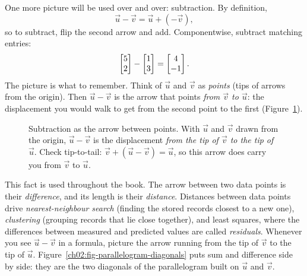 One more picture will be used over and over: subtraction. By definition,
\[
  \vec{u} - \vec{v} = \vec{u} + (-\vec{v}),
\]
so to subtract, flip the second arrow and add. Componentwise, subtract matching entries:
\[
  \begin{bmatrix}5\\2\end{bmatrix} - \begin{bmatrix}1\\3\end{bmatrix} = \begin{bmatrix}4\\-1\end{bmatrix}.
\]
The picture is what to remember. Think of $\vec{u}$ and $\vec{v}$ as
\emph{points} (tips of arrows from the origin). Then $\vec{u}-\vec{v}$ is the arrow that
points \emph{from $\vec{v}$ to $\vec{u}$}: the displacement you would walk to get from the
second point to the first (Figure~\ref{ch02:fig-subtract}).

\begin{figure}[H]
\centering
{}
\caption{Subtraction as the arrow between points. With $\vec{u}$ and $\vec{v}$ drawn from
the origin, $\vec{u}-\vec{v}$ is the displacement \emph{from the tip of $\vec{v}$ to the
tip of $\vec{u}$}. Check tip-to-tail: $\vec{v} + (\vec{u}-\vec{v}) = \vec{u}$, so this
arrow does carry you from $\vec{v}$ to $\vec{u}$.}
\label{ch02:fig-subtract}
\end{figure}

This fact is used throughout the book. The arrow between two data points is their
\emph{difference}, and its length is their \emph{distance}. Distances between data points
drive \emph{nearest-neighbour search} (finding the stored records closest to a new one),
\emph{clustering} (grouping records that lie close together), and least squares, where
the differences between measured and predicted values are called \emph{residuals}.
Whenever you see $\vec{u}-\vec{v}$ in a formula, picture the arrow running from the tip
of $\vec{v}$ to the tip of $\vec{u}$. Figure~\ref{ch02:fig-parallelogram-diagonals} puts
sum and difference side by side: they are the two diagonals of the parallelogram built
on $\vec{u}$ and $\vec{v}$.

